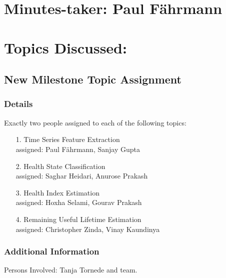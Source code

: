 \documentclass[11pt]{meetingmins} %
\begin{document}
\maketitle

\section{Minutes-taker: Paul Fährmann}

\section{Topics Discussed:}

\subsection{New Milestone Topic Assignment}
    \subsubsection{Details}
        \begin{hiddensubitems}
            \item
                Exactly two people assigned to each of the following topics:
            \begin{enumerate}
            	\item[1.] Time Series Feature Extraction\\
            	assigned: Paul Fährmann, Sanjay Gupta
            	\item[2.] Health State Classification\\
            	assigned: Saghar Heidari, Anurose Prakash
            	\item[3.] Health Index Estimation\\
            	assigned: Hoxha Selami, Gourav Prakash
        		\item[4.] Remaining Useful Lifetime Estimation\\
        		assigned: Christopher Zinda, Vinay Kaundinya
            \end{enumerate}
        \end{hiddensubitems}
        
    \subsubsection{Additional Information}
        \begin{hiddensubitems}
            \item
                Persons Involved: Tanja Tornede and team.
        \end{hiddensubitems}
\end{document}

